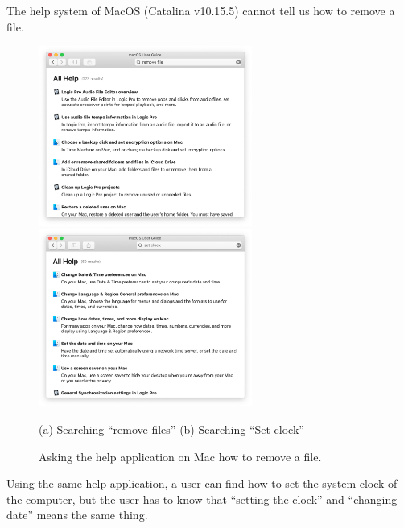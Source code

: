\documentclass[manuscript,screen,review]{acmart}
\begin{document}
The help system of MacOS (Catalina v10.15.5) cannot tell us how to remove a file.

\begin{figure}[H]
  \includegraphics[width=7cm,bb=-50 0 950 800]{figures/eaa80e41ddc3d3620fae133007274573.png}
  \includegraphics[width=7cm,bb=-50 0 950 800]{figures/0cd679128d8f69eb2a8a966d6466a8a4.png}
  \par
  (a) Searching ``remove files'' \hspace{3cm} (b) Searching ``Set clock''
  \caption{Asking the help application on Mac how to remove a file.}
\end{figure}

Using the same help application, 
a user can find how to set the system clock of the computer,
but the user has to know that
``setting the clock'' and ``changing date'' means the same thing.

\end{document}
